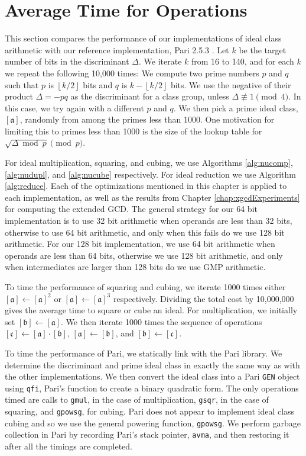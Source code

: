 \documentclass{ucalgthes1}
\theoremstyle{definition}
\newcommand{\floor}[1]{\left\lfloor #1 \right\rfloor}
\newcommand{\ideal}{\mathfrak}
\newcommand{\idealclass}[1]{\left[ \ideal #1 \right]}
\newcommand{\aclass}{\idealclass a}
\newcommand{\bclass}{\idealclass b}
\newcommand{\cclass}{\idealclass c}
\newcommand{\Pari}{Pari 2.5.3}
\begin{document}
\section{Average Time for Operations}
\label{sec:idealResults}

This section compares the performance of our implementations of ideal class arithmetic with our reference implementation, \Pari{} \cite{PariGP}.   Let $k$ be the target number of bits in the discriminant $\Delta$.  We iterate $k$ from 16 to 140, and for each $k$ we repeat the following 10,000 times: We compute two prime numbers $p$ and $q$ such that $p$ is $\floor{k/2}$ bits and $q$ is $k-\floor{k/2}$ bits.  We use the negative of their product $\Delta = -pq$ as the discriminant for a class group, unless $\Delta \not\equiv 1 \pmod 4$.  In this case, we try again with a different $p$ and $q$.  We then pick a prime ideal class, $[\mathfrak a]$, randomly from among the primes less than 1000.  One motivation for limiting this to primes less than 1000 is the size of the lookup table for $\sqrt{\Delta \bmod p} \pmod p$.

For ideal multiplication, squaring, and cubing, we use Algorithms \ref{alg:nucomp}, \ref{alg:nudupl}, and \ref{alg:nucube} respectively.  For ideal reduction we use Algorithm \ref{alg:reduce}.  Each of the optimizations mentioned in this chapter is applied to each implementation, as well as the results from Chapter \ref{chap:xgcdExperiments} for computing the extended GCD.   The general strategy for our 64 bit implementation is to use 32 bit arithmetic when operands are less than 32 bits, otherwise to use 64 bit arithmetic, and only when this fails do we use 128 bit arithmetic.  For our 128 bit implementation, we use 64 bit arithmetic when operands are less than 64 bits, otherwise we use 128 bit arithmetic, and only when intermediates are larger than 128 bits do we use GMP arithmetic.

To time the performance of squaring and cubing, we iterate 1000 times either $[\mathfrak a] \gets [\mathfrak a]^2$ or $\aclass \gets [\mathfrak a]^3$ respectively.  Dividing the total cost by 10,000,000 gives the average time to square or cube an ideal.  For multiplication, we initially set $\bclass \gets [\mathfrak a]$.  We then iterate 1000 times the sequence of operations $\cclass \gets \aclass \cdot \bclass$, $\aclass \gets \bclass$, and $\bclass \gets \cclass$.


To time the performance of Pari, we statically link with the Pari library.  We determine the discriminant and prime ideal class in exactly the same way as with the other implementations.  We then convert the ideal class into a Pari \texttt{GEN} object using \texttt{qfi}, Pari's function to create a binary quadratic form.  The only operations timed are calls to \texttt{gmul}, in the case of multiplication, \texttt{gsqr}, in the case of squaring, and \texttt{gpowsg}, for cubing.  Pari does not appear to implement ideal class cubing and so we use the general powering function, \texttt{gpowsg}.  We perform garbage collection in Pari by recording Pari's stack pointer, \texttt{avma}, and then restoring it after all the timings are completed.
\end{document}
